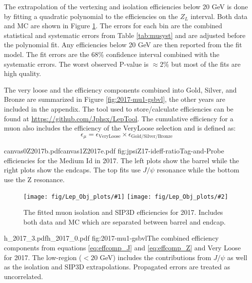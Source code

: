 The extrapolation of the vertexing and isolation efficiencies below 20 GeV is done by fitting a quadratic polynomial to the efficiencies on the $Z_L$ interval.  Both data and MC are shown in Figure \ref{fig:eff17-extraps}.  The errors for each bin are the combined statistical and systematic errors from Table \ref{tab:musyst} and are adjusted before the polynomial fit. Any efficiencies below 20 GeV are then reported from the fit model. The fit errors are the 68\% confidence interval combined with the systematic errors. The worst observed P-value is $\approx 2\%$ but most of the fits are high quality.

The very loose and the efficiency components combined into Gold, Silver, and Bronze are summarized in Figure \ref{fig:2017-mu1-gsbvl}, the other years are included in the appendix. The tool used to store/calculate efficiencies can be found at \url{https://github.com/Jphsx/LepTool}.  The cumulative efficiency for a muon also includes the efficiency of the VeryLoose selection and is defined as:
\begin{equation}
\epsilon_\mu = \epsilon_{\text{VeryLoose}} \times \epsilon_{\text{Gold/Silver/Bronze}}
\end{equation}

\newcommand\FigureTwo[4]{%
\begin{figure}[!htbp]%
\centering
\texttt{[image: fig/Lep\_Obj\_plots/\#1]}\hfill
\texttt{[image: fig/Lep\_Obj\_plots/\#2]}\hfill
\caption{#4}
\label{#3}
\end{figure}}

%
           {canvas0Z2017b.pdf}{canvas1Z2017e.pdf}%
          {fig:jpsiZ17-ideff-ratio}{Tag-and-Probe efficiencies for the Medium Id in 2017. The left plots show the barrel while the right plots show the endcaps. The top fits use $J/\psi$ resonance while the bottom use the Z resonance. }

\FigureTwo{effFit_2.pdf}{effFit_5.pdf}%
          {fig:eff17-extraps}{The fitted muon isolation and SIP3D efficiencies for 2017. Includes both data and MC which are separated between barrel and endcap.  }



		   {h_2017_3.pdf}{h_2017_0.pdf}
		   {fig:2017-mu1-gsbvl}{The combined efficiency components from equations \ref{eq:effcomp_J} and \ref{eq:effcomp_Z} and Very Loose for 2017. The low-\pt region ($<20$ GeV) includes the contributions from $J/\psi$ as well as the isolation and SIP3D extrapolations. Propagated errors are treated as uncorrelated.}


